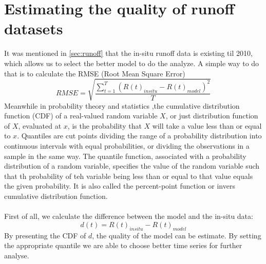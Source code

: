 \section{Estimating the quality of runoff datasets}\label{sec:runoffdata}
It was mentioned in \autoref{sec:runoff} that the in-situ runoff data is existing til 2010, which allows us to select the better model to do the analyze. A simple way to do that is to calculate the RMSE (Root Mean Square Error)
\begin{equation*}
	RMSE = \sqrt{\frac{\sum_{t=1}^T (R(t)_{insitu} - R(t)_{model})^2}{T}}
\end{equation*}
Meanwhile in probability theory and statistics ,the cumulative distribution function (CDF) of a real-valued random variable $X$, or just distribution function of $X$, evaluated at $x$, is the probability that $X$ will take a value less than or equal to $x$. Quantiles are cut points dividing the range of a probability distribution into continuous intervals with equal probabilities, or dividing the observations in a sample in the same way. The quantile function, associated with a probability distribution of a random variable, specifies the value of the random variable such that th probability of teh variable being less than or equal to that value equals the given probability. It is also called the percent-point function or invers cumulative distribution function. \\\\
First of all, we calculate the difference between the model and the in-situ data:
\begin{equation}
d(t) = R(t)_{insitu} - R(t)_{model}
\end{equation}
By presenting the CDF of $d$, the quality of the model can be estimate. By setting the appropriate quantile we are able to choose better time series for further analyse. 

